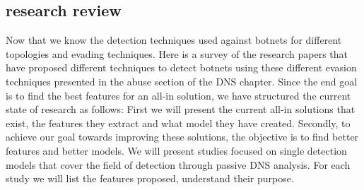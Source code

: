 \subsection{research review}
Now that we know the detection techniques used against botnets for different topologies and evading techniques. Here is a survey of the research papers that have proposed different techniques to detect botnets using these different evasion techniques presented in the abuse section of the DNS chapter.
Since the end goal is to find the best features for an all-in solution, we have structured the current state of research as follows: 
First we will present the current all-in solutions that exist, the features they extract and what model they have created. 
Secondly, to achieve our goal towards improving these solutions, the objective is to find better features and better models. We will present studies focused on single detection models that cover the field of detection through passive DNS analysis. For each study we will list the features proposed, understand their purpose.\\







